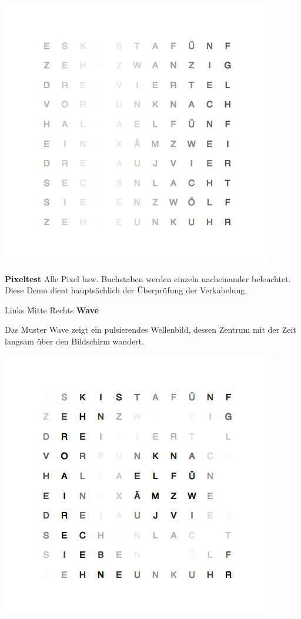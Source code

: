 \begin{multicols}{2}
{
    \centering
    \includegraphics[width=\columnwidth]{Abbildungen/Software/Demo/Fade}
}


\textbf{Pixeltest} Alle Pixel bzw. Buchstaben werden einzeln nacheinander beleuchtet. Diese Demo dient hauptsächlich der Überprüfung der Verkabelung.

\begin{tabbing}
 Links \= Mitte \= Rechts \kill
 \> \textbf{Wave}
\end{tabbing}

Das Muster Wave zeigt ein pulsierendes Wellenbild, dessen Zentrum mit der Zeit langsam über den Bildschirm wandert.

{
    \centering
    \includegraphics[width=\columnwidth]{Abbildungen/Software/Demo/Welle}
}


\end{multicols}
